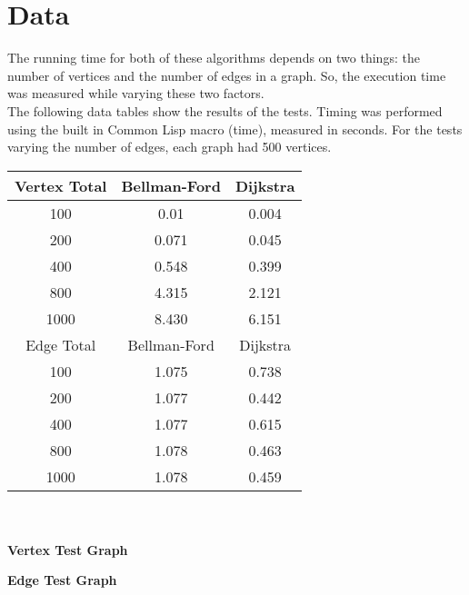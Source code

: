 \documentclass{article}
\begin{document}
  \section*{Data}
The running time for both of these algorithms depends on two things: the number of vertices and the number of edges in a graph. So, the execution time was measured while varying these two factors.\\
The following data tables show the results of the tests. Timing was performed using the built in Common Lisp macro (time), measured in seconds. For the tests varying the number of edges, each graph had 500 vertices.\\
\begin{center}
\begin{tabular}{|c|c|c|}
\hline
Vertex Total & Bellman-Ford & Dijkstra \\
\hline
100 & 0.01 & 0.004 \\
\hline
200 & 0.071 & 0.045 \\
\hline
400 & 0.548 & 0.399 \\
\hline
800 & 4.315 & 2.121 \\
\hline
1000 & 8.430 & 6.151 \\
\hline
\hline
Edge Total & Bellman-Ford & Dijkstra \\
\hline
100 & 1.075 & 0.738 \\
\hline
200 & 1.077 & 0.442 \\
\hline
400 & 1.077 & 0.615 \\
\hline
800 & 1.078 & 0.463 \\
\hline
1000 & 1.078 & 0.459 \\
\hline
\end{tabular}
\\ \ \\
\textbf{Vertex Test Graph}\\
\newpage
\textbf{Edge Test Graph}\\
\\

\end{center}
\end{document}
